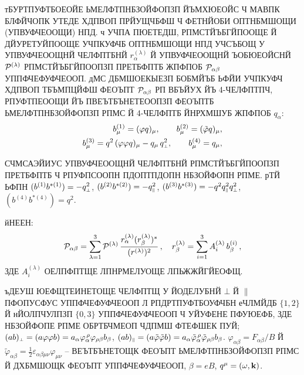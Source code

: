 \documentclass[koi8-r]{pazh2col}
\def\mprp{\mbox{\tiny $\bot$}}
\def\mprl{\mbox{\tiny $\|$}}
\def\beq{\begin{eqnarray}}
\def\eeq{\end{eqnarray}}
\def\beq{\begin{eqnarray}}
\def\eeq{\end{eqnarray}}
\begin{document}
тБУРТПУФТБОЕОЙЕ ЬМЕЛФТПНБЗОЙФОПЗП ЙЪМХЮЕОЙС Ч МАВПК БЛФЙЧОПК УТЕДЕ ХДПВОП 
ПРЙУЩЧБФШ Ч ФЕТНЙОБИ ОПТНБМШОЩИ (УПВУФЧЕООЩИ) НПД. ч УЧПА ПЮЕТЕДШ,  
РПМСТЙЪБГЙПООЩЕ Й ДЙУРЕТУЙПООЩЕ УЧПКУФЧБ ОПТНБМШОЩИ НПД УЧСЪБОЩ У 
УПВУФЧЕООЩНЙ ЧЕЛФПТБНЙ $r_{\alpha}^{(\lambda)}$ Й УПВУФЧЕООЩНЙ ЪОБЮЕОЙСНЙ 
${\cal P}^{(\lambda)}$ РПМСТЙЪБГЙПООПЗП 
ПРЕТБФПТБ ЖПФПОБ ${\cal P}_{\alpha \beta}$ УППФЧЕФУФЧЕООП. дМС ДБМШОЕКЫЕЗП БОБМЙЪБ ЬФЙИ УЧПКУФЧ ХДПВОП ТБЪМПЦЙФШ 
ФЕОЪПТ ${\cal P}_{\alpha \beta}$ РП ВБЪЙУХ ЙЪ  
4-ЧЕЛФПТПЧ, РПУФТПЕООЩИ ЙЪ ПВЕЪТБЪНЕТЕООПЗП ФЕОЪПТБ ЬМЕЛФТПНБЗОЙФОПЗП 
РПМС Й 4-ЧЕЛФПТБ ЙНРХМШУБ ЖПФПОБ $q_\alpha$:
%
\beq
\label{eq:basis}
b_{\mu}^{(1)} = (\varphi q)_\mu, \qquad
 b_{\mu}^{(2)} = (\tilde \varphi q)_\mu, 
\\
\nonumber
b_{\mu}^{(3)} = q^2 \, (\varphi \varphi q)_\mu - q_\mu \, q^2_{\mbox{\tiny $\bot$}}, 
\qquad b_{\mu}^{(4)} = q_\mu, 
\eeq 

\noindent СЧМСАЭЙИУС УПВУФЧЕООЩНЙ ЧЕЛФПТБНЙ РПМСТЙЪБГЙПООПЗП ПРЕТБФПТБ Ч РПУФПСООПН 
ПДОПТПДОПН НБЗОЙФОПН РПМЕ. рТЙ ЬФПН $(b^{(1)} b^{*(1)}) = -q^2_{\mprp}$, 
$(b^{(2)} b^{*(2)}) = -q^2_{\mprl}$, $(b^{(3)} b^{*(3)}) = -q^2 q^2_{\mprl} 
q^2_{\mprp}$, $(b^{(4)} b^{*(4)}) = q^2$. 

йНЕЕН:  
%
%
\beq
\label{eq:Pab10}
{\cal P}_{\alpha \beta} = \sum_{\lambda = 1}^{3} 
 {\cal P}^{(\lambda)} \, \frac{r_{\alpha}^{(\lambda)} 
(r_{\beta}^{(\lambda)})^{*}}{(r^{(\lambda)})^2} \, , \quad 
r_{\beta}^{(\lambda)} = \sum\limits_{i = 1}^{3} A_i^{(\lambda)} \, b_{\beta}^{(i)} \, , 
\eeq
\noindent ЗДЕ  $A_i^{(\lambda)}$ ОЕЛПФПТЩЕ ЛПНРМЕЛУОЩЕ ЛПЬЖЖЙГЙЕОФЩ.

ъДЕУШ  ЮЕФЩТЕИНЕТОЩЕ ЧЕЛФПТЩ У ЙОДЕЛУБНЙ $\bot$ Й $\parallel$ ПФОПУСФУС
УППФЧЕФУФЧЕООП Л РПДРТПУФТБОУФЧБН еЧЛМЙДБ $\{1, 2\}$ Й нЙОЛПЧУЛПЗП $\{0, 3\}$ УППФЧЕФУФЧЕООП 
Ч УЙУФЕНЕ ПФУЮЕФБ, ЗДЕ НБЗОЙФОПЕ РПМЕ ОБРТБЧМЕОП ЧДПМШ ФТЕФШЕК ПУЙ;
$(ab)_{\mprp} = (a \varphi \varphi b) = a_\alpha \varphi_{\alpha}^{\, \rho} \varphi_{\rho \beta} b_\beta$, 
$(ab)_{\mprl} = (a \tilde \varphi \tilde \varphi b) = 
a_\alpha \tilde \varphi_{\alpha}^{\, \rho} 
\tilde \varphi_{\rho \beta} b_\beta$.  $\varphi_{\alpha \beta} =  F_{\alpha
	\beta} /B$  Й
${\tilde \varphi}_{\alpha \beta} = \frac{1}{2} \varepsilon_{\alpha \beta
	\mu \nu} \varphi_{\mu \nu}$ -- ВЕЪТБЪНЕТОЩК ФЕОЪПТ ЬМЕЛФТПНБЗОЙФОПЗП РПМС 
Й ДХБМШОЩК ФЕОЪПТ  УППФЧЕФУФЧЕООП, $\beta = eB$, $q^{\mu} = (\omega, {\bf k})$. 
\end{document}
